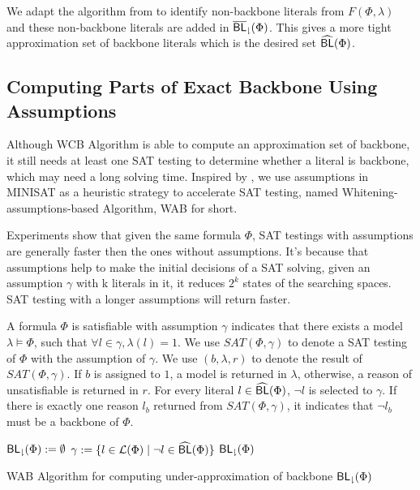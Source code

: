 We adapt the algorithm from \cite{Jon75} to identify non-backbone literals from $F(\Phi,\lambda)$ and these non-backbone literals are added in ${\sf \overline{BL}_\downharpoonright}(\Phi)$.
This gives a more tight approximation set of backbone literals which is the desired set ${\sf \widehat{BL}}(\Phi)$.
\fi

\subsection{Computing Parts of Exact Backbone Using Assumptions}

Although WCB Algorithm is able to compute an approximation set of backbone, it still needs at least one SAT testing to determine whether a literal is backbone, which may need a long solving time. Inspired by \cite{JLM15}, we use assumptions in MINISAT as a heuristic strategy to accelerate SAT testing, named Whitening-assumptions-based Algorithm, WAB for short.

Experiments show that given the same formula $\Phi$, SAT testings with assumptions are generally faster then the ones without assumptions. It's because that assumptions help to make the initial decisions of a SAT solving, given an assumption $\gamma$ with k literals in it, it reduces $2^k$ states of the searching spaces. SAT testing with a longer assumptions will return faster.

A formula $\Phi$ is satisfiable with assumption $\gamma$ indicates that there exists a model $\lambda\models\Phi$, such that $\forall l\in\gamma, \lambda(l)=1$. We use $SAT(\Phi,\gamma)$ to denote a SAT testing of $\Phi$ with the assumption of $\gamma$. We use $(b, \lambda, r)$ to denote the result of $SAT(\Phi,\gamma)$. If $b$ is assigned to $1$, a model is returned in $\lambda$, otherwise, a reason of unsatisfiable is returned in $r$. For every literal $l\in{\sf \widehat{BL}}(\Phi)$, $\neg l$ is selected to $\gamma$.
If there is exactly one reason $l_b$ returned from $SAT(\Phi,\gamma)$, it indicates that $\neg l_b$ must be a backbone of $\Phi$.


\begin{algorithm2e}
\SetAlgoShortEnd
\SetFillComment
{}
${\sf {BL}_\downharpoonright}(\Phi):=\emptyset$\;
$\gamma:=\{l\in\Lit(\Phi) \mid \neg l\in\BLap(\Phi)\}$\; \label{alg4:init}
\Return ${\sf {BL}_\downharpoonright}(\Phi)$\;
\caption{WAB Algorithm for computing under-approximation of backbone ${\sf {BL}_\downharpoonright}(\Phi)$}
\label{alg:assum}
\end{algorithm2e}

